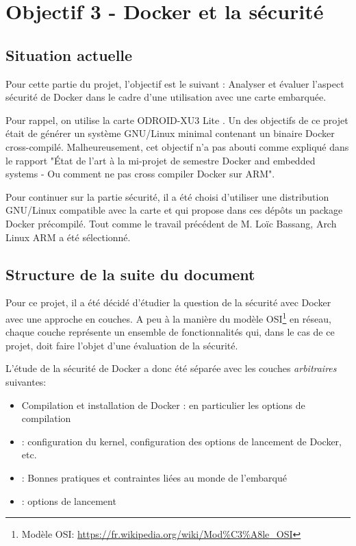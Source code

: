 \documentclass[11pt,a4paper,oneside]{report}
\newcommand{\oldreportname}{État de l’art à la mi-projet de semestre Docker and embedded systems - Ou comment ne pas cross compiler Docker sur ARM}
\newcommand{\odroid}{ODROID-XU3 Lite }
\begin{document}
\chapter{Objectif 3 - Docker et la sécurité}

\section{Situation actuelle}
Pour cette partie du projet, l'objectif est le suivant : Analyser et évaluer l'aspect sécurité de Docker dans le cadre d'une utilisation avec une carte embarquée.

Pour rappel, on utilise la carte \odroid. Un des objectifs de ce projet était de générer un système GNU/Linux minimal contenant un binaire Docker cross-compilé. Malheureusement, cet objectif n'a pas abouti comme expliqué dans le rapport "\oldreportname".

Pour continuer sur la partie sécurité, il a été choisi d'utiliser une distribution GNU/Linux compatible avec la carte et qui propose dans ces dépôts un package Docker précompilé. Tout comme le travail précédent de M. Loïc Bassang, Arch Linux ARM a été sélectionné.

\section{Structure de la suite du document}

Pour ce projet, il a été décidé d'étudier la question de la sécurité avec Docker avec une approche en couches. A peu à la manière du modèle OSI\footnote{Modèle OSI: \url{https://fr.wikipedia.org/wiki/Mod\%C3\%A8le_OSI}} en réseau, chaque couche représente un ensemble de fonctionnalités qui, dans le cas de ce projet, doit faire l'objet d'une évaluation de la sécurité.

L'étude de la sécurité de Docker a donc été séparée avec les couches \textit{arbitraires} suivantes:

\begin{itemize}

\item Compilation et installation de Docker : en particulier les options  de compilation

\item {} : configuration du kernel, configuration des options de lancement de Docker, etc.

\item {} : Bonnes pratiques et contraintes liées au monde de l'embarqué

\item {} : options de lancement

\end{itemize}
\end{document}
